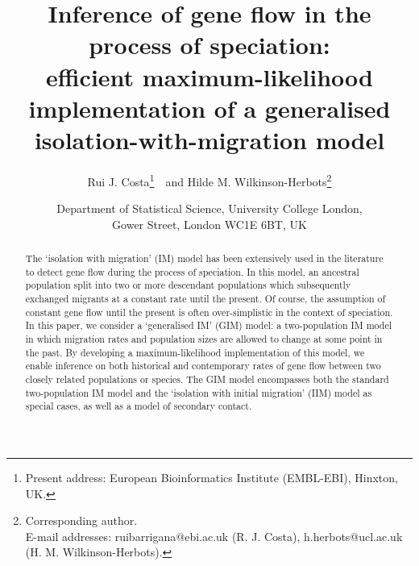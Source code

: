 \documentclass[11pt]{article}
\title{\vspace*{-1.5cm} \Large
\textbf{
Inference of gene flow in the process of speciation:\\ efficient maximum-likelihood implementation of a generalised isolation-with-migration model
}}
\author{Rui J. Costa\thanks{Present address: European Bioinformatics Institute (EMBL-EBI), Hinxton, UK.}~~and Hilde M. Wilkinson-Herbots\thanks{Corresponding author.\\E-mail addresses: ruibarrigana@ebi.ac.uk (R. J. Costa), h.herbots@ucl.ac.uk (H. M. Wilkinson-Herbots).}}
\date{\normalsize{\vspace{-0.5cm} Department of Statistical Science, University College London,\\Gower Street, London WC1E 6BT, UK}}
\begin{document}
\maketitle

\vspace*{-1cm}

\begin{abstract}
The `isolation with migration' (IM) model has been extensively used in the literature to detect gene flow during
the process of speciation. In this model, an ancestral population split into two or more descendant populations which subsequently
exchanged migrants at a constant rate until the present. Of course, the assumption of constant gene flow until the present is often 
over-simplistic in the context of speciation. In this paper, we consider a `generalised IM' (GIM) model: a two-population IM model in
which migration rates and population sizes are allowed to change at some point in the past. By developing a maximum-likelihood
implementation of this model, we enable inference on both historical and contemporary rates of gene flow between two closely
related populations or species. The GIM model encompasses both the standard two-population IM model and the `isolation with initial migration' (IIM) model as special cases, as well as a model of secondary contact. 

\end{abstract}
\end{document}
